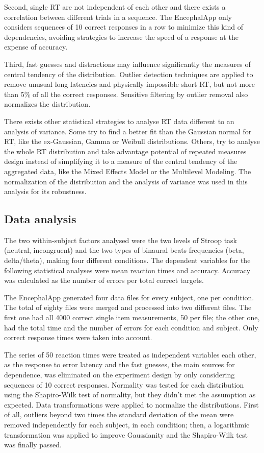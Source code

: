 \documentclass[10pt]{article}
\begin{document}
Second, single RT are not independent of each other and there exists a correlation between different trials in a sequence. The EncephalApp only considers sequences of 10 correct responses in a row to minimize this kind of dependencies, avoiding strategies to increase the speed of a response at the expense of accuracy\cite{Bajaj2013a}.

Third, fast guesses and distractions may influence significantly the measures of central tendency of the distribution. Outlier detection techniques are applied to remove unusual long latencies and physically impossible short RT, but not more than 5\% of all the correct responses. Sensitive filtering by outlier removal also normalizes the distribution\cite{Ratcliff1993}.

There exists other statistical strategies to analyse RT data different to an analysis of variance. Some try to find a better fit than the Gaussian normal for RT, like the ex-Gaussian, Gamma or Weibull distributions\cite{VanZandt2000}. Others, try to analyse the whole RT distribution and take advantage potential of repeated measures design instead of simplifying it to a measure of the central tendency of the aggregated data, like the Mixed Effects Model\cite{Baayen2008} or the Multilevel Modeling\cite{VanZandt2000}. The normalization of the distribution and the analysis of variance was used in this analysis for its robustness.

\subsection*{Data analysis}

The two within-subject factors analysed were the two levels of Stroop task (neutral, incongruent) and the two types of binaural beats frequencies (beta, delta/theta), making four different conditions. The dependent variables for the following statistical analyses were mean reaction times and accuracy. Accuracy was calculated as the number of errors per total correct targets.

The EncephalApp generated four data files for every subject, one per condition. The total of eighty files were merged and processed into two different files. The first one had all 4000 correct single item measurements, 50 per file; the other one, had the total time and the number of errors for each condition and subject. Only correct response times were taken into account.

The series of 50 reaction times were treated as independent variables each other, as the response to error latency and the fast guesses, the main sources for dependence, was eliminated on the experiment design by only considering sequences of 10 correct responses. Normality was tested for each distribution using the Shapiro-Wilk test of normality, but they didn't met the assumption as expected. Data transformations were applied to normalize the distributions. First of all, outliers beyond two times the standard deviation of the mean were removed independently for each subject, in each condition; then, a logarithmic transformation was applied to improve Gaussianity and the Shapiro-Wilk test was finally passed.
\end{document}
